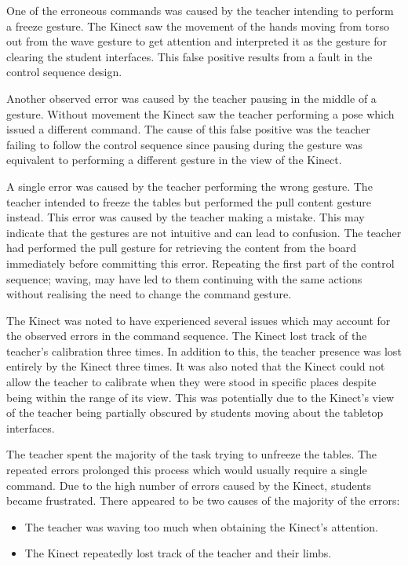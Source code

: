 \documentclass[manuscript, review, screen]{acmart}
\begin{document}
One of the erroneous commands was caused by the teacher intending to perform a freeze gesture.
The Kinect saw the movement of the hands moving from torso out from the wave gesture to get attention and interpreted it as the gesture for clearing the student interfaces.
This false positive results from a fault in the control sequence design.

Another observed error was caused by the teacher pausing in the middle of a gesture.
Without movement the Kinect saw the teacher performing a pose which issued a different command.
The cause of this false positive was the teacher failing to follow the control sequence since pausing during the gesture was equivalent to performing a different gesture in the view of the Kinect.

A single error was caused by the teacher performing the wrong gesture.
The teacher intended to freeze the tables but performed the pull content gesture instead. 
This error was caused by the teacher making a mistake.
This may indicate that the gestures are not intuitive and can lead to confusion.
The teacher had performed the pull gesture for retrieving the content from the board immediately before committing this error.
Repeating the first part of the control sequence; waving, may have led to them continuing with the same actions without realising the need to change the command gesture.

The Kinect was noted to have experienced several issues which may account for the observed errors in the command sequence.
The Kinect lost track of the teacher's calibration three times.
In addition to this, the teacher presence was lost entirely by the Kinect three times.
It was also noted that the Kinect could not allow the teacher to calibrate when they were stood in specific places despite being within the range of its view.
This was potentially due to the Kinect's view of the teacher being partially obscured by students moving about the tabletop interfaces.

The teacher spent the majority of the task trying to unfreeze the tables.
The repeated errors prolonged this process which would usually require a single command.
Due to the high number of errors caused by the Kinect, students became frustrated.
There appeared to be two causes of the majority of the errors:

\begin{itemize}
\item The teacher was waving too much when obtaining the Kinect's attention.
\item The Kinect repeatedly lost track of the teacher and their limbs. 
\end{itemize}
\end{document}
